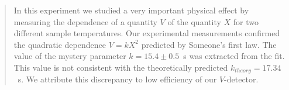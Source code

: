 \begin{abstract}
In this experiment we studied a very important physical effect by measuring the
dependence of a quantity $V$ of the quantity $X$ for two different sample
temperatures.  Our experimental measurements confirmed the quadratic dependence
$V = kX^2$ predicted by Someone's first law. The value of the mystery parameter
$k = 15.4\pm 0.5$~s was extracted from the fit. This value is
not consistent with the theoretically predicted $k_{theory}=17.34$~s. We attribute this
discrepancy to low efficiency of our $V$-detector.
\end{abstract}

